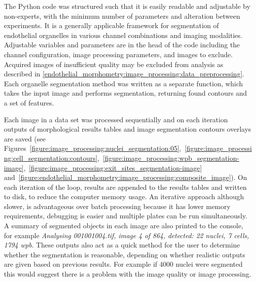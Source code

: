 The Python code was structured such that it is easily readable and adjustable by non-experts, with the minimum number of parameters and alteration between experiments. It is a generally applicable framework for segmentation of endothelial organelles in various channel combinations and imaging modalities. Adjustable variables and parameters are in the head of the code including the channel configuration, image processing parameters, and images to exclude. Acquired images of insufficient quality may be excluded from analysis as described in \autoref{endothelial_morphometry:image_processing:data_preprocessing}. Each organelle segmentation method was written as a separate function, which takes the input image and performs segmentation, returning found contours and a set of features.


Each image in a data set was processed sequentially and on each iteration outputs of morphological results tables and image segmentation contours overlays are saved (see Figures~\ref{figure:image_processing:nuclei_segmentation:05},~\ref{figure:image_processing:cell_segmentation:contours},~\ref{figure:image_processing:wpb_segmentation-image},~\ref{figure:image_processing:exit_sites_segmentation-image} and~\ref{figure:endothelial_morphometry:image_processing:composite_image}). On each iteration of the loop, results are appended to the results tables and written to disk, to reduce the computer memory usage. An iterative approach although slower, is advantageous over batch processing because it has lower memory requirements, debugging is easier and multiple plates can be run simultaneously. A summary of segmented objects in each image are also printed to the console, for example \emph{Analysing 001001004.tif, image 4 of 864, detected: 22 nuclei, 7 cells, 1794 wpb}. These outputs also act as a quick method for the user to determine whether the segmentation is reasonable, depending on whether realistic outputs are given based on previous results. For example if 4000 nuclei were segmented this would suggest there is a problem with the image quality or image processing.


